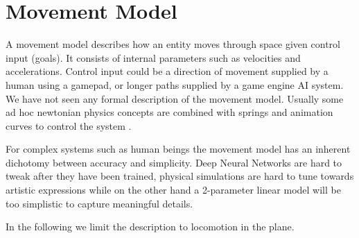\section{Movement Model}
A movement model describes how an entity moves through space given control input (goals). It consists of internal parameters such as velocities and accelerations. Control input could be a direction of movement supplied by a human using a gamepad, or longer paths supplied by a game engine AI system. We have not seen any formal description of the movement model. Usually some ad hoc newtonian physics concepts are combined with springs and animation curves to control the system .

For complex systems such as human beings the movement model has an inherent dichotomy between accuracy and simplicity. Deep Neural Networks are hard to tweak after they have been trained, physical simulations are hard to tune towards artistic expressions while on the other hand a 2-parameter linear model will be too simplistic to capture meaningful details.



In the following we limit  the description to locomotion in the plane. 
